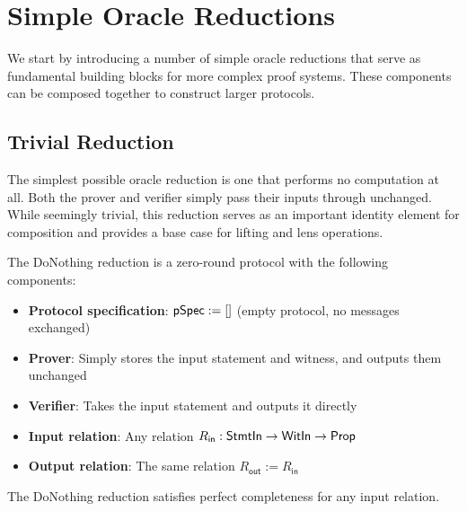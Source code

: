 \section{Simple Oracle Reductions}

We start by introducing a number of simple oracle reductions that serve as fundamental building blocks for more complex proof systems. These components can be composed together to construct larger protocols.

\subsection{Trivial Reduction}

The simplest possible oracle reduction is one that performs no computation at all. Both the prover and verifier simply pass their inputs through unchanged. While seemingly trivial, this reduction serves as an important identity element for composition and provides a base case for lifting and lens operations.

\begin{definition}
    \label{def:donothing_reduction}
    The DoNothing reduction is a zero-round protocol with the following components:
    \begin{itemize}
        \item \textbf{Protocol specification}: $\mathsf{pSpec} := []$ (empty protocol, no messages exchanged)
        \item \textbf{Prover}: Simply stores the input statement and witness, and outputs them unchanged
        \item \textbf{Verifier}: Takes the input statement and outputs it directly
        \item \textbf{Input relation}: Any relation $R_{\mathsf{in}} : \mathsf{StmtIn} \to \mathsf{WitIn} \to \mathsf{Prop}$
        \item \textbf{Output relation}: The same relation $R_{\mathsf{out}} := R_{\mathsf{in}}$
    \end{itemize}
\end{definition}

\begin{theorem}
    The DoNothing reduction satisfies perfect completeness for any input relation.
\end{theorem}


